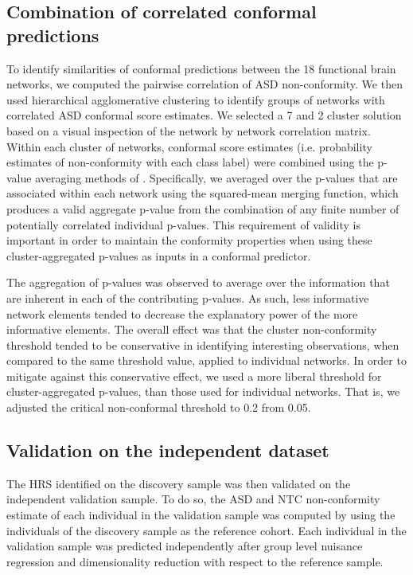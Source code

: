 \documentclass[9pt,lineno]{elife}
\begin{document}
\subsection{Combination of correlated conformal predictions}
To identify similarities of conformal predictions between the 18 functional brain networks, we computed the pairwise correlation of ASD non-conformity. We then used hierarchical agglomerative clustering to identify groups of networks with correlated ASD conformal score estimates. We selected a 7 and 2 cluster solution based on a visual inspection of the network by network correlation matrix.
Within each cluster of networks, conformal score estimates (i.e. probability estimates of non-conformity with each class label) were combined using the p-value averaging methods of \citep{Vovk2012-of}. Specifically, we averaged over the p-values that are associated within each network using the squared-mean merging function, which produces a valid aggregate p-value from the combination of any finite number of potentially correlated individual p-values. This requirement of validity is important in order to maintain the conformity properties when using these cluster-aggregated p-values as inputs in a conformal predictor.

The aggregation of p-values was observed to average over the information that are inherent in each of the contributing p-values. As such, less informative network elements tended to decrease the explanatory power of the more informative elements. The overall effect was that the cluster non-conformity threshold tended to be conservative in identifying interesting observations, when compared to the same threshold value, applied to individual networks. In order to mitigate against this conservative effect, we used a more liberal threshold for cluster-aggregated p-values, than those used for individual networks. That is, we adjusted the critical non-conformal threshold to 0.2 from 0.05. 

\subsection{Validation on the independent dataset}
The HRS identified on the discovery sample was then validated on the independent validation sample. To do so, the ASD and NTC non-conformity estimate of each individual in the validation sample was computed by using the individuals of the discovery sample as the reference cohort. Each individual in the validation sample was predicted independently after group level nuisance regression and dimensionality reduction with respect to the reference sample.
\end{document}
